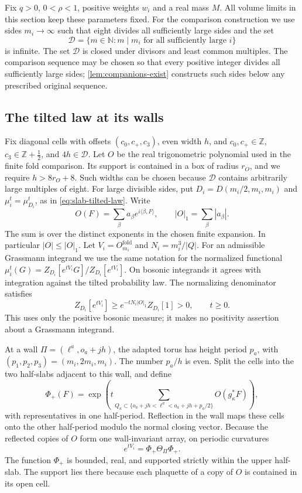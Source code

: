 \documentclass[11pt,letterpaper,reqno]{amsart}
\newcommand{\Z}{\mathbb Z}
\newcommand{\N}{\mathbb N}
\begin{document}
Fix $q>0$, $0<\rho<1$, positive weights $w_i$ and a real mass $M$.
All volume limits in this section keep these parameters fixed. For the comparison construction we
use sides $m_i\to\infty$ such that eight divides all sufficiently
large sides and the set
\[
 \mathcal D=\{m\in\N:m\mid m_i\text{ for all sufficiently large }i\}
\]
is infinite. The set $\mathcal D$ is closed under divisors and least
common multiples. The comparison sequence may be chosen so that every positive integer
divides all sufficiently large sides; \cref{lem:companions-exist}
constructs such sides below any prescribed original sequence.

\subsection{The tilted law at its walls}\label{subsec:diag-wall-law}

Fix diagonal cells with offsets $(c_0,c_+,c_3)$, even width $h$, and
$c_0,c_+\in\Z$, $c_3\in\Z+\tfrac12$, and $4h\in\mathcal D$.
Let $O$ be the real trigonometric polynomial used in the finite fold
comparison. Its support is contained in a box of radius $r_O$, and
we require $h>8r_O+8$. Such widths can be chosen because
$\mathcal D$ contains arbitrarily large multiples of eight. For
large divisible sides, put $D_i=D(m_i/2,m_i,m_i)$ and
$\mu_i^t=\mu_{D_i}^t$, as in \eqref{eq:slab-tilted-law}. Write
\[
 O(F)=\sum_\beta a_\beta e^{i\langle\beta,F\rangle},
 \qquad |O|_1=\sum_\beta|a_\beta|.
\]
The sum is over the distinct exponents in the chosen finite expansion.
In particular $|O|\le|O|_1$. Let $V_i=O_{m_i}^{\mathrm{fold}}$ and
$N_i=m_i^3/|Q|$. For an admissible Grassmann integrand we use
the same notation for the normalized functional
$\mu_i^t(G)=Z_{D_i}[e^{tV_i}G]/Z_{D_i}[e^{tV_i}]$.
On bosonic integrands it agrees with integration against the
tilted probability law. The normalizing denominator satisfies
\begin{equation}\label{eq:diag-tilt-denominator}
 Z_{D_i}[e^{tV_i}]\ge e^{-tN_i|O|_1}Z_{D_i}[1]>0,
 \qquad t\ge0.
\end{equation}
This uses only the positive bosonic measure; it makes no positivity
assertion about a Grassmann integrand.

At a wall $\Pi=(\ell^a,o_a+jh)$, the adapted torus has height period
$p_a$, with $(p_1,p_2,p_3)=(m_i,2m_i,m_i)$. The number $p_a/h$ is
even. Split the cells into the two half-slabs adjacent to this wall,
and define
\[
 \Phi_+(F)=\exp\left(t\sum_{Q_\kappa\subset
              \{o_a+jh<\ell^a<o_a+jh+p_a/2\}}O(g_\kappa^*F)\right),
\]
with representatives in one half-period. Reflection in the wall
maps these cells onto the other half-period modulo the normal closing
vector. Because the reflected copies of $O$ form one wall-invariant
array, on periodic curvatures
\begin{equation}\label{eq:diag-wall-factorization}
 e^{tV_i}=\Phi_+\Theta_\Pi\Phi_+.
\end{equation}
The function $\Phi_+$ is bounded, real, and supported strictly within
the upper half-slab. The support lies there because each plaquette
of a copy of $O$ is contained in its open cell.
\end{document}
